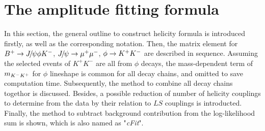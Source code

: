 \def\BR{{\cal B}}
\def\DLL{{\rm DLL}}
\def\PDF{{\cal P}}
\def\NDOF{\hbox{\rm ndf}}
\def\coskj{\cos(K,\jpsi)}
\def\funone{{\cal F}^{\rm bkg}_1}
\def\funtwo{{\cal F}^{\rm bkg}_2}
\def\cosks{\cos\theta_{\Kstar}}
\def\cospsi{\cos\theta_{\jpsi}}
\def\cosphi{\cos\theta_{\phiz}}
\def\phiksphi{\Delta{\phi}_{\Kstar,\phiz}}
\def\phikspsi{\Delta{\phi}_{\Kstar,\jpsi}}
\def\cosx{\cos\theta_{X}}
\def\phixphi{\Delta\phi_{X,\phiz}}
\def\phixpsi{\Delta\phi_{X,\jpsi}}
\def\cosz{\cos\theta_{Z}}
\def\phizphi{{\Delta\phi}_{Z,\phiz}}
\def\phizpsi{{\Delta\phi}_{Z,\jpsi}}
\def\mphik{m_{\phiz\kaon}}
\def\mjpsiphi{m_{\jpsi\phiz}}
\def\mjpsik{m_{\jpsi\kaon}}

\def\Kst{{K^*}}
\def\Zm{Z^-}
\def\Zp{Z^+}
\def\LambdaStar{{N^*}}
\def\LambdaStarn{{N^*_{\!n}}}
\def\H{{\cal H}}
\def\F#1{\{#1\}}
\def\BA#1#2#3{{#1}_{{#2}}^{\,\,\F{\!#3\!}}}
\def\Mat{\mathcal{M}}


\section{The amplitude fitting formula}
\label{sec:03_matrixelement}

In this section,
the general outline to construct helicity formula is introduced firstly,
as well as the corresponding notation.
Then,
the matrix element for ${{{B}^+}}\rightarrow{\ensuremath{{J\mskip -3mu/\mskip -2mu\psi}}}\phi{\ensuremath{{K}^-}}$, ${{J\mskip -3mu/\mskip -2mu\psi}}\rightarrow\mu^+\mu^-$, $\phi\rightarrow{\ensuremath{{K}^+}}{\ensuremath{{K}^-}}$ are described in sequence. 
Assuming the selected events of $K^+K^-$ are all from $\phi$ decays, 
the mass-dependent term of $m_{{{K}^-}{{K}^+}}$ for $\phi$ lineshape is common for all decay chains, 
and omitted to save computation time.
Subsequently,  
the method to combine all decay chains togethor is discussed.
Besides,
a possible reduction of number of helicity couplings to determine from the data by their relation to $LS$ couplings is introducted.
Finally,
the method to subtract background contribution from the log-likelihood sum is shown, 
which is also named as "\emph{cFit}".

